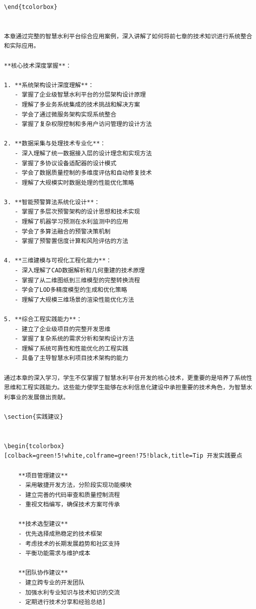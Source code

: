 \begin{lstlisting}
\end{tcolorbox}


本章通过完整的智慧水利平台综合应用案例，深入讲解了如何将前七章的技术知识进行系统整合和实际应用。

**核心技术深度掌握**：

1. **系统架构设计深度理解**：
   - 掌握了企业级智慧水利平台的分层架构设计原理
   - 理解了多业务系统集成的技术挑战和解决方案
   - 学会了通过微服务架构实现系统整合
   - 掌握了复杂权限控制和多用户访问管理的设计方法

2. **数据采集与处理技术专业化**：
   - 深入理解了统一数据接入层的设计理念和实现方法
   - 掌握了多协议设备适配器的设计模式
   - 学会了数据质量控制的多维度评估和自动修复技术
   - 理解了大规模实时数据处理的性能优化策略

3. **智能预警算法系统化设计**：
   - 掌握了多层次预警架构的设计思想和技术实现
   - 理解了机器学习预测在水利监测中的应用
   - 学会了多算法融合的预警决策机制
   - 掌握了预警置信度计算和风险评估的方法

4. **三维建模与可视化工程化能力**：
   - 深入理解了CAD数据解析和几何重建的技术原理
   - 掌握了从二维图纸到三维模型的完整转换流程
   - 学会了LOD多精度模型的生成和优化策略
   - 理解了大规模三维场景的渲染性能优化方法

5. **综合工程实践能力**：
   - 建立了企业级项目的完整开发思维
   - 掌握了复杂系统的需求分析和架构设计方法
   - 理解了系统可靠性和性能优化的工程实践
   - 具备了主导智慧水利项目技术架构的能力

通过本章的深入学习，学生不仅掌握了智慧水利平台开发的核心技术，更重要的是培养了系统性思维和工程实践能力。这些能力使学生能够在水利信息化建设中承担重要的技术角色，为智慧水利事业的发展做出贡献。

\section{实践建议}


\begin{tcolorbox}[colback=green!5!white,colframe=green!75!black,title=Tip 开发实践要点
    
    **项目管理建议**
    - 采用敏捷开发方法，分阶段实现功能模块
    - 建立完善的代码审查和质量控制流程
    - 重视文档编写，确保技术方案可传承
    
    **技术选型建议**
    - 优先选择成熟稳定的技术框架
    - 考虑技术的长期发展趋势和社区支持
    - 平衡功能需求与维护成本
    
    **团队协作建议**
    - 建立跨专业的开发团队
    - 加强水利专业知识与技术知识的交流
    - 定期进行技术分享和经验总结]

\end{lstlisting}
